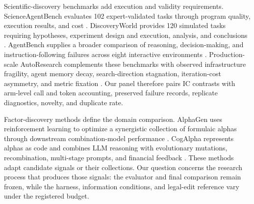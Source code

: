 Scientific-discovery benchmarks add execution and validity requirements. ScienceAgentBench evaluates 102 expert-validated tasks through program quality, execution results, and cost \citep{chen2024scienceagentbench}. DiscoveryWorld provides 120 simulated tasks requiring hypotheses, experiment design and execution, analysis, and conclusions \citep{jansen2024discoveryworld}. AgentBench supplies a broader comparison of reasoning, decision-making, and instruction-following failures across eight interactive environments \citep{liu2023agentbench}. Production-scale AutoResearch complements these benchmarks with observed infrastructure fragility, agent memory decay, search-direction stagnation, iteration-cost asymmetry, and metric fixation \citep{chandran2026production}. Our panel therefore pairs IC contrasts with arm-level call and token accounting, preserved failure records, replicate diagnostics, novelty, and duplicate rate.

Factor-discovery methods define the domain comparison. AlphaGen uses reinforcement learning to optimize a synergistic collection of formulaic alphas through downstream combination-model performance \citep{yu2023generating}. CogAlpha represents alphas as code and combines LLM reasoning with evolutionary mutations, recombination, multi-stage prompts, and financial feedback \citep{liu2025cogalpha}. These methods adapt candidate signals or their collections. Our question concerns the research process that produces those signals: the evaluator and final comparison remain frozen, while the harness, information conditions, and legal-edit reference vary under the registered budget.
